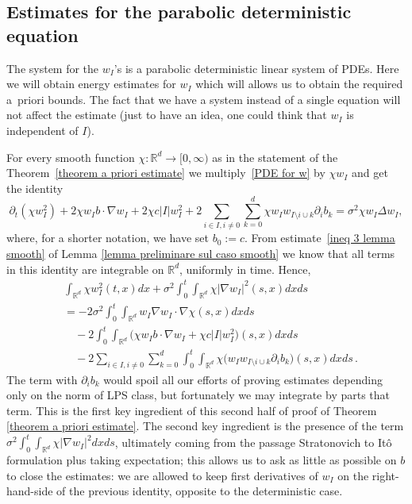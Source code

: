 \documentclass[a4paper,10pt]{article}
\begin{document}
\subsection{Estimates for the parabolic deterministic equation}
\label{section_parabolic_estimates}

The system for the $w_I$'s is a parabolic deterministic linear system of PDEs. Here we will obtain energy estimates for $w_I$ which will allows us to obtain the required a~priori bounds. The fact that we have a system instead of a single equation will not affect the estimate (just to have an idea, one could think that $w_I$ is independent of $I$).
 
For every smooth function $\chi:\mathbb{R}^{d}\rightarrow
\lbrack0,\infty)$ as in the statement of the Theorem~\ref{theorem a priori estimate} we multiply~\eqref{PDE for w} by $\chi w_I$ and get the identity
\[
\partial_{t}(\chi w_{I}^{2})  +2\chi w_{I}b\cdot\nabla
w_{I}+2\chi c\vert I\vert w_{I}^{2}+2\sum_{i\in I,i\neq0}\sum
_{k=0}^{d}\chi w_{I}w_{I\setminus i\cup k}\partial_{i}b_{k}=\sigma^{2}\chi
w_{I}\Delta w_{I},
\]
where, for a shorter notation, we have set $b_0 := c$. 
From estimate~\eqref{ineq 3 lemma smooth} of Lemma
\ref{lemma preliminare sul caso smooth} we know that all terms in this
identity are integrable on $\mathbb{R}^{d}$, uniformly in time. Hence, 
\begin{align*}
&  \int_{\mathbb{R}^{d}}\chi w_{I}^{2}(t,x)  dx+\sigma^{2} 
\int_{0}^{t}\int_{\mathbb{R}^{d}}\chi\vert \nabla w_{I}\vert
^{2} (s,x)dxds\\
&  =-2\sigma^{2}\int_{0}^{t}\int_{\mathbb{R}^{d}}w_{I}\nabla w_{I}\cdot
\nabla\chi  (s,x) dxds\\
& \quad {}  -2\int_{0}^{t}\int_{\mathbb{R}^{d}} \big(\chi w_{I}b\cdot\nabla
w_{I}+\chi c\vert I\vert w_{I}^{2} \big)  (s,x)
dxds\\
& \quad {}  -2\sum_{i\in I,i\neq0}\sum_{k=0}^{d}\int_{0}^{t}\int_{\mathbb{R}^{d}} 
\chi \big(w_{I}w_{I\setminus i\cup k}\partial_{i}b_{k}\big)  (
s,x)  dxds \,.
\end{align*}
The term with $\partial_{i}b_{k}$ would spoil all our efforts of proving
estimates depending only on the norm of LPS class, but fortunately we may
integrate by parts that term. This is
the first key ingredient of this second half of proof of Theorem
\ref{theorem a priori estimate}. The second key ingredient is the presence of
the term $\sigma^{2}\int_{0}^{t}\int_{\mathbb{R}^{d}}\chi\vert \nabla
w_{I}\vert ^{2}dxds$, ultimately coming from the passage Stratonovich to It\^o formulation plus taking expectation; this allows us to ask as little as possible on $b$ to
close the estimates: we are allowed to keep first derivatives of $w_{I}$ on
the right-hand-side of the previous identity, opposite to the deterministic case.
\end{document}
